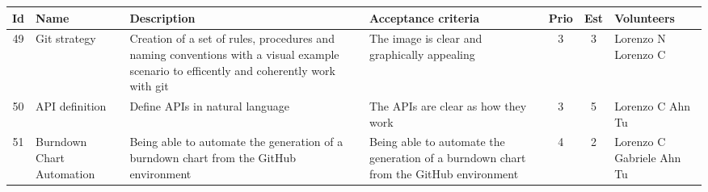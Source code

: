 \newpage
\begin{tabular}{|c|m{1.5cm}|m{4cm}|m{2.5cm}|c|c|m{1.8cm}|}
	\hline	     \textbf{Id}&\textbf{Name}&\textbf{Description}&\textbf{Acceptance criteria}&\textbf{Prio}&\textbf{Est}&\textbf{Volunteers}\\
	\hline
	49 & Git strategy & 
	Creation of a set of rules, procedures and naming conventions with a visual example scenario to efficently and coherently work with git & 
	The image is clear and graphically appealing &
	3 & 3 & 
	Lorenzo N Lorenzo C \\
	
	\hline
	50 & API definition & 
	Define APIs in natural language & 
	The APIs are clear as how they work &
	3 & 5 & 
	Lorenzo C Ahn Tu \\
	
	\hline
	51 & Burndown Chart Automation & 
	Being able to automate the generation of a burndown chart from the GitHub environment & 
	Being able to automate the generation of a burndown chart from the GitHub environment &
	4 & 2 & 
	Lorenzo C Gabriele Ahn Tu \\
	\hline
\end{tabular}
